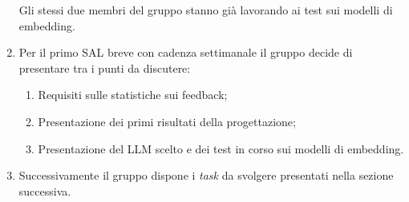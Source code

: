 \begin{enumerate}
    Gli stessi due membri del gruppo stanno già lavorando ai test sui modelli di embedding.
    \item Per il primo SAL breve con cadenza settimanale il gruppo decide di presentare tra i punti da discutere:
        \begin{enumerate}
            \item Requisiti sulle statistiche sui feedback;
            \item Presentazione dei primi risultati della progettazione;
            \item Presentazione del LLM scelto e dei test in corso sui modelli di embedding.
            
        \end{enumerate}

    \item Successivamente il gruppo dispone i \textit{task} da svolgere presentati nella sezione successiva.
\end{enumerate}